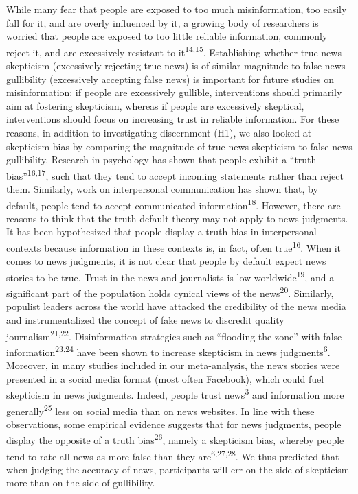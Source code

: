 \documentclass[
  man]{apa6}
\begin{document}
While many fear that people are exposed to too much misinformation, too easily fall for it, and are overly influenced by it, a growing body of researchers is worried that people are exposed to too little reliable information, commonly reject it, and are excessively resistant to it\textsuperscript{14,15}. Establishing whether true news skepticism (excessively rejecting true news) is of similar magnitude to false news gullibility (excessively accepting false news) is important for future studies on misinformation: if people are excessively gullible, interventions should primarily aim at fostering skepticism, whereas if people are excessively skeptical, interventions should focus on increasing trust in reliable information. For these reasons, in addition to investigating discernment (H1), we also looked at skepticism bias by comparing the magnitude of true news skepticism to false news gullibility. Research in psychology has shown that people exhibit a ``truth bias''\textsuperscript{16,17}, such that they tend to accept incoming statements rather than reject them. Similarly, work on interpersonal communication has shown that, by default, people tend to accept communicated information\textsuperscript{18}. However, there are reasons to think that the truth-default-theory may not apply to news judgments. It has been hypothesized that people display a truth bias in interpersonal contexts because information in these contexts is, in fact, often true\textsuperscript{16}. When it comes to news judgments, it is not clear that people by default expect news stories to be true. Trust in the news and journalists is low worldwide\textsuperscript{19}, and a significant part of the population holds cynical views of the news\textsuperscript{20}. Similarly, populist leaders across the world have attacked the credibility of the news media and instrumentalized the concept of fake news to discredit quality journalism\textsuperscript{21,22}. Disinformation strategies such as ``flooding the zone'' with false information\textsuperscript{23,24} have been shown to increase skepticism in news judgments\textsuperscript{6}. Moreover, in many studies included in our meta-analysis, the news stories were presented in a social media format (most often Facebook), which could fuel skepticism in news judgments. Indeed, people trust news\textsuperscript{3} and information more generally\textsuperscript{25} less on social media than on news websites. In line with these observations, some empirical evidence suggests that for news judgments, people display the opposite of a truth bias\textsuperscript{26}, namely a skepticism bias, whereby people tend to rate all news as more false than they are\textsuperscript{6,27,28}. We thus predicted that when judging the accuracy of news, participants will err on the side of skepticism more than on the side of gullibility.
\end{document}
